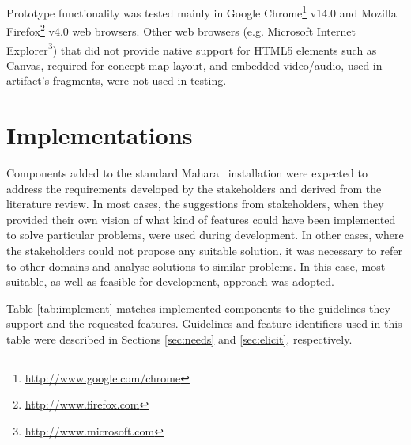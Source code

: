 Prototype functionality was tested mainly in Google
Chrome\footnote{\url{http://www.google.com/chrome}} v14.0 and Mozilla
Firefox\footnote{\url{http://www.firefox.com}} v4.0 web browsers. Other web
browsers (e.g. Microsoft Internet
Explorer\footnote{\url{http://www.microsoft.com}}) that did not provide native
support for HTML5 elements such as Canvas, required for concept map layout, and
embedded video/audio, used in artifact's fragments, were not used in testing.

\section{Implementations}

Components added to the standard Mahara \ep~installation were expected to
address the requirements developed by the stakeholders and derived from the
literature review. In most cases, the suggestions from stakeholders, when they
provided their own vision of what kind of features could have been implemented
to solve particular problems, were used during development. In other cases,
where the stakeholders could not propose any suitable solution, it was necessary
to refer to other domains and analyse solutions to similar problems. In this
case, most suitable, as well as feasible for development, approach was adopted.

Table \ref{tab:implement} matches implemented components to the guidelines they
support and the requested features. Guidelines and feature identifiers used in
this table were described in Sections \ref{sec:needs} and \ref{sec:elicit},
respectively.

